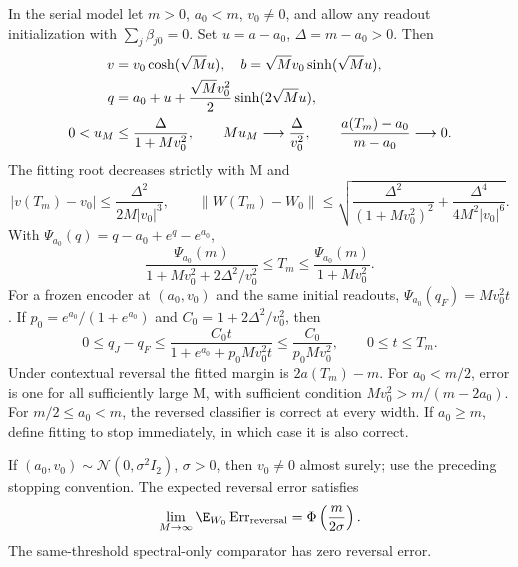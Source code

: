 \begin{corollary}
\label{cor:astra_isotropic}
In the serial model let $m>0$, $a_0<m$, $v_0\ne0$, and allow any
readout initialization with $\sum_j\beta_{j0}=0$. Set
$u=a-a_0$, $\Delta=m-a_0>0$. Then
\begin{align}
 v&=v_0\cosh(\sqrt M u),\quad b=\sqrt Mv_0\sinh(\sqrt M u),
 \label{eq:astra_iso_phase}\\
 q&=a_0+u+\frac{\sqrt Mv_0^2}{2}\sinh(2\sqrt M u),\notag\\
 0<u_M&\le\frac{\Delta}{1+Mv_0^2},\qquad
 Mu_M\longrightarrow\frac{\Delta}{v_0^2},\qquad
 \frac{a(T_m)-a_0}{m-a_0}\longrightarrow0.
 \label{eq:astra_iso_update}
\end{align}
The fitting root decreases strictly with M and
\begin{equation}\label{eq:astra_iso_disp}
 |v(T_m)-v_0|\le\frac{\Delta^2}{2M|v_0|^3},\qquad
 \|W(T_m)-W_0\|\le
 \sqrt{\frac{\Delta^2}{(1+Mv_0^2)^2}+
       \frac{\Delta^4}{4M^2|v_0|^6}}.
\end{equation}
With $\Psi_{a_0}(q)=q-a_0+e^q-e^{a_0}$,
\[
 \frac{\Psi_{a_0}(m)}{1+Mv_0^2+2\Delta^2/v_0^2}
 \le T_m\le\frac{\Psi_{a_0}(m)}{1+Mv_0^2}.
\]
For a frozen encoder at $(a_0,v_0)$ and the same initial readouts,
$\Psi_{a_0}(q_F)=Mv_0^2t$. If
$p_0=e^{a_0}/(1+e^{a_0})$ and $C_0=1+2\Delta^2/v_0^2$, then
\begin{equation}\label{eq:astra_iso_gap}
 0\le q_J-q_F\le\frac{C_0t}{1+e^{a_0}+p_0Mv_0^2t}
 \le\frac{C_0}{p_0Mv_0^2},\qquad0\le t\le T_m.
\end{equation}
Under contextual reversal the fitted margin is $2a(T_m)-m$.
For $a_0<m/2$, error is one for all sufficiently large M, with sufficient
condition $Mv_0^2>m/(m-2a_0)$. For $m/2\le a_0<m$, the reversed
classifier is correct at every width. If $a_0\ge m$, define fitting to
stop immediately, in which case it is also correct.

If $(a_0,v_0)\sim\mathcal N(0,\sigma^2 I_2)$, $\sigma>0$, then
$v_0\ne0$ almost surely; use the preceding stopping convention.
The expected reversal error satisfies
\begin{equation}\label{eq:astra_iso_error}
 \lim_{M\to\infty}\E_{W_0}\operatorname{Err}_{\rm reversal}
 =\Phi\left(\frac{m}{2\sigma}\right).
\end{equation}
The same-threshold spectral-only comparator has zero reversal error.
\end{corollary}
